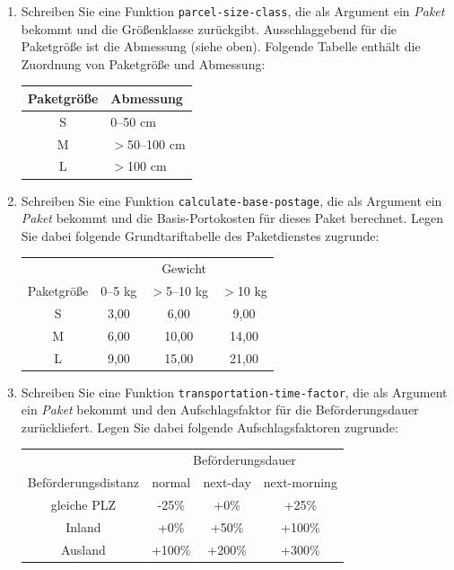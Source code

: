 \begin{aufgabe}
\begin{enumerate}
  \item Schreiben Sie eine Funktion \texttt{parcel-size-class}, die
    als Argument ein \textit{Paket} bekommt und die Größenklasse
    zurückgibt.  Ausschlaggebend für die Paketgröße ist die Abmessung
    (siehe oben).  Folgende Tabelle enthält die Zuordnung von
    Paketgröße und Abmessung:

    \begin{center}
      \begin{tabular}{c|l}
        Paketgröße & Abmessung \\
        \hline
        S & 0--50 cm \\
        M & $>$50--100 cm \\
        L & $>$100 cm \\
      \end{tabular}
    \end{center}

  \item Schreiben Sie eine Funktion \texttt{calculate-base-postage},
    die als Argument ein \textit{Paket} bekommt und die
    Basis-Portokosten für dieses Paket berechnet.  Legen Sie dabei
    folgende Grundtariftabelle des Paketdienstes zugrunde:

    \begin{center}
      \begin{tabular}{c|ccc}
        & \multicolumn{3}{c}{Gewicht} \\
        Paketgröße & 0--5 kg & $>$5--10 kg & $>$10 kg \\
        \hline
        S & 3,00 & 6,00 & 9,00 \\
        M & 6,00 & 10,00 & 14,00 \\
        L & 9,00 & 15,00 & 21,00 \\
      \end{tabular}
    \end{center}

    

  \item Schreiben Sie eine Funktion
    \texttt{transportation-time-factor}, die als Argument ein
    \textit{Paket} bekommt und den Aufschlagsfaktor für die
    Beförderungsdauer zurückliefert.  Legen Sie dabei folgende
    Aufschlagsfaktoren zugrunde:
    
    \begin{center}
      \begin{tabular}{c|ccc}
        & \multicolumn{3}{c}{Beförderungsdauer} \\
        Beförderungsdistanz & normal & next-day & next-morning \\
        \hline
        gleiche PLZ & -25\% & +0\% & +25\% \\
        Inland & +0\% & +50\% & +100\% \\
        Ausland & +100\% & +200\% & +300\% \\
      \end{tabular}
    \end{center}
    

\end{enumerate}
\end{aufgabe}
